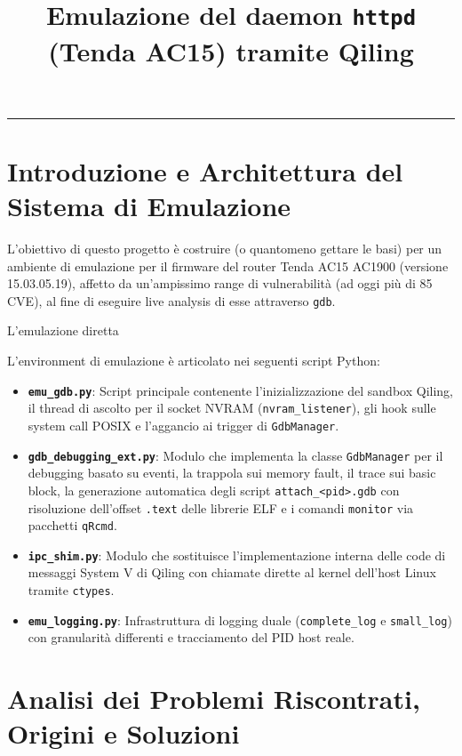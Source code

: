\documentclass[11pt,a4paper]{article}
\title{\textbf{Emulazione del daemon \texttt{httpd} (Tenda AC15) tramite Qiling}}
\date{}
\begin{document}
\maketitle

\tableofcontents
\vspace{1cm}
\hrule
\vspace{0.5cm}

\newpage

\section{Introduzione e Architettura del Sistema di Emulazione}
L'obiettivo di questo progetto è costruire (o quantomeno gettare le basi) per un ambiente di emulazione per il firmware del router Tenda AC15 AC1900 (versione 15.03.05.19), affetto da un'ampissimo range di vulnerabilità (ad oggi più di 85 CVE), al fine di eseguire live analysis di esse attraverso \texttt{gdb}.

L'emulazione diretta    

L'environment di emulazione è articolato nei seguenti script Python:
\begin{itemize}
    \item \textbf{\texttt{emu\_gdb.py}}: Script principale contenente l'inizializzazione del sandbox Qiling, il thread di ascolto per il socket NVRAM (\texttt{nvram\_listener}), gli hook sulle system call POSIX e l'aggancio ai trigger di \texttt{GdbManager}.
    \item \textbf{\texttt{gdb\_debugging\_ext.py}}: Modulo che implementa la classe \texttt{GdbManager} per il debugging basato su eventi, la trappola sui memory fault, il trace sui basic block, la generazione automatica degli script \texttt{attach\_<pid>.gdb} con risoluzione dell'offset \texttt{.text} delle librerie ELF e i comandi \texttt{monitor} via pacchetti \texttt{qRcmd}.
    \item \textbf{\texttt{ipc\_shim.py}}: Modulo che sostituisce l'implementazione interna delle code di messaggi System V di Qiling con chiamate dirette al kernel dell'host Linux tramite \texttt{ctypes}.
    \item \textbf{\texttt{emu\_logging.py}}: Infrastruttura di logging duale (\texttt{complete\_log} e \texttt{small\_log}) con granularità differenti e tracciamento del PID host reale.
\end{itemize}

\section{Analisi dei Problemi Riscontrati, Origini e Soluzioni}
\end{document}
